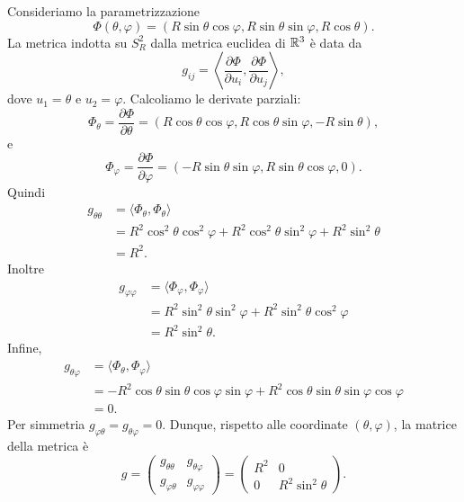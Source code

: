 \documentclass[a4paper]{article}
\begin{document}
\begin{snippetsolution}{}
    Consideriamo la parametrizzazione
    \[
        \Phi(\theta,\varphi)
        =
        \left(
            R\sin\theta\cos\varphi,
            R\sin\theta\sin\varphi,
            R\cos\theta
        \right).
    \]
    La metrica indotta su \(S_R^2\) dalla metrica euclidea di \(\mathbb{R}^3\) è data da
    \[
        g_{ij}=\left\langle \frac{\partial\Phi}{\partial u_i},\frac{\partial\Phi}{\partial u_j}\right\rangle,
    \]
    dove \(u_1=\theta\) e \(u_2=\varphi\).
    Calcoliamo le derivate parziali:
    \[
        \Phi_\theta
        =
        \frac{\partial\Phi}{\partial\theta}
        =
        \left(
            R\cos\theta\cos\varphi,
            R\cos\theta\sin\varphi,
            -R\sin\theta
        \right),
    \]
    e
    \[
        \Phi_\varphi
        =
        \frac{\partial\Phi}{\partial\varphi}
        =
        \left(
            -R\sin\theta\sin\varphi,
            R\sin\theta\cos\varphi,
            0
        \right).
    \]
    Quindi
    \begin{align*}
        g_{\theta\theta}
        &=
        \langle \Phi_\theta,\Phi_\theta\rangle\\
        &=
        R^2\cos^2\theta\cos^2\varphi
        +
        R^2\cos^2\theta\sin^2\varphi
        +
        R^2\sin^2\theta\\
        &=
        R^2.
    \end{align*}
    Inoltre
    \begin{align*}
        g_{\varphi\varphi}
        &=
        \langle \Phi_\varphi,\Phi_\varphi\rangle\\
        &=
        R^2\sin^2\theta\sin^2\varphi
        +
        R^2\sin^2\theta\cos^2\varphi\\
        &=
        R^2\sin^2\theta.
    \end{align*}
    Infine,
    \begin{align*}
        g_{\theta\varphi}
        &=
        \langle \Phi_\theta,\Phi_\varphi\rangle\\
        &=
        -R^2\cos\theta\sin\theta\cos\varphi\sin\varphi
        +
        R^2\cos\theta\sin\theta\sin\varphi\cos\varphi\\
        &=
        0.
    \end{align*}
    Per simmetria \(g_{\varphi\theta}=g_{\theta\varphi}=0\). Dunque, rispetto alle coordinate \((\theta,\varphi)\), la matrice della metrica è
    \[
        g
        =
        \begin{pmatrix}
            g_{\theta\theta} & g_{\theta\varphi}\\
            g_{\varphi\theta} & g_{\varphi\varphi}
        \end{pmatrix}
        =
        \begin{pmatrix}
            R^2 & 0\\
            0 & R^2\sin^2\theta
        \end{pmatrix}.
    \]
\end{snippetsolution}
\end{document}
